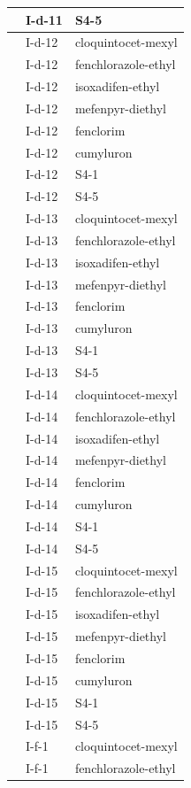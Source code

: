 \documentclass[11pt,a4paper]{article}
\begin{document}
\begin{table}[h]
\begin{tabular}{|l|l|l|}
 & I-d-11 & S4-5 \\ \hline
 & I-d-12 & cloquintocet-mexyl \\ \hline
 & I-d-12 & fenchlorazole-ethyl \\ \hline
 & I-d-12 & isoxadifen-ethyl \\ \hline
 & I-d-12 & mefenpyr-diethyl \\ \hline
 & I-d-12 & fenclorim \\ \hline
 & I-d-12 & cumyluron \\ \hline
 & I-d-12 & S4-1 \\ \hline
 & I-d-12 & S4-5 \\ \hline
 & I-d-13 & cloquintocet-mexyl \\ \hline
 & I-d-13 & fenchlorazole-ethyl \\ \hline
 & I-d-13 & isoxadifen-ethyl \\ \hline
 & I-d-13 & mefenpyr-diethyl \\ \hline
 & I-d-13 & fenclorim \\ \hline
 & I-d-13 & cumyluron \\ \hline
 & I-d-13 & S4-1 \\ \hline
 & I-d-13 & S4-5 \\ \hline
 & I-d-14 & cloquintocet-mexyl \\ \hline
 & I-d-14 & fenchlorazole-ethyl \\ \hline
 & I-d-14 & isoxadifen-ethyl \\ \hline
 & I-d-14 & mefenpyr-diethyl \\ \hline
 & I-d-14 & fenclorim \\ \hline
 & I-d-14 & cumyluron \\ \hline
 & I-d-14 & S4-1 \\ \hline
 & I-d-14 & S4-5 \\ \hline
 & I-d-15 & cloquintocet-mexyl \\ \hline
 & I-d-15 & fenchlorazole-ethyl \\ \hline
 & I-d-15 & isoxadifen-ethyl \\ \hline
 & I-d-15 & mefenpyr-diethyl \\ \hline
 & I-d-15 & fenclorim \\ \hline
 & I-d-15 & cumyluron \\ \hline
 & I-d-15 & S4-1 \\ \hline
 & I-d-15 & S4-5 \\ \hline
 & I-f-1 & cloquintocet-mexyl \\ \hline
 & I-f-1 & fenchlorazole-ethyl \\ \hline

\end{tabular}
\end{table}
\end{document}
